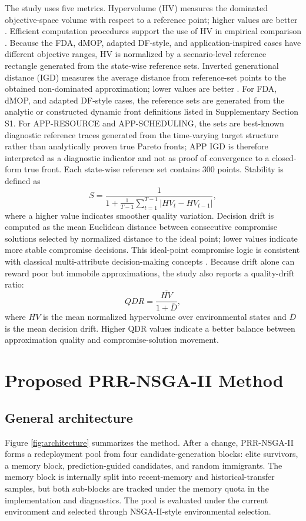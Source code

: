 \documentclass[1p,times]{elsarticle}
\begin{document}
The study uses five metrics. Hypervolume (HV) measures the dominated objective-space volume with respect to a reference point; higher values are better \cite{zitzler1999}. Efficient computation procedures support the use of HV in empirical comparison \cite{fonseca2006}. Because the FDA, dMOP, adapted DF-style, and application-inspired cases have different objective ranges, HV is normalized by a scenario-level reference rectangle generated from the state-wise reference sets. Inverted generational distance (IGD) measures the average distance from reference-set points to the obtained non-dominated approximation; lower values are better \cite{coello2007}. For FDA, dMOP, and adapted DF-style cases, the reference sets are generated from the analytic or constructed dynamic front definitions listed in Supplementary Section S1. For APP-RESOURCE and APP-SCHEDULING, the sets are best-known diagnostic reference traces generated from the time-varying target structure rather than analytically proven true Pareto fronts; APP IGD is therefore interpreted as a diagnostic indicator and not as proof of convergence to a closed-form true front. Each state-wise reference set contains 300 points. Stability is defined as
\begin{equation}
S = \frac{1}{1+\frac{1}{T-1}\sum_{t=1}^{T-1}|HV_t-HV_{t-1}|},
\end{equation}
where a higher value indicates smoother quality variation. Decision drift is computed as the mean Euclidean distance between consecutive compromise solutions selected by normalized distance to the ideal point; lower values indicate more stable compromise decisions. This ideal-point compromise logic is consistent with classical multi-attribute decision-making concepts \cite{hwang1981}.
Because drift alone can reward poor but immobile approximations, the study also reports a quality-drift ratio:
\begin{equation}
QDR = \frac{\overline{HV}}{1+\overline{D}},
\end{equation}
where $\overline{HV}$ is the mean normalized hypervolume over environmental states and $\overline{D}$ is the mean decision drift. Higher QDR values indicate a better balance between approximation quality and compromise-solution movement.

\section{Proposed PRR-NSGA-II Method}
\subsection{General architecture}
Figure \ref{fig:architecture} summarizes the method. After a change, PRR-NSGA-II forms a redeployment pool from four candidate-generation blocks: elite survivors, a memory block, prediction-guided candidates, and random immigrants. The memory block is internally split into recent-memory and historical-transfer samples, but both sub-blocks are tracked under the memory quota in the implementation and diagnostics. The pool is evaluated under the current environment and selected through NSGA-II-style environmental selection.
\end{document}
